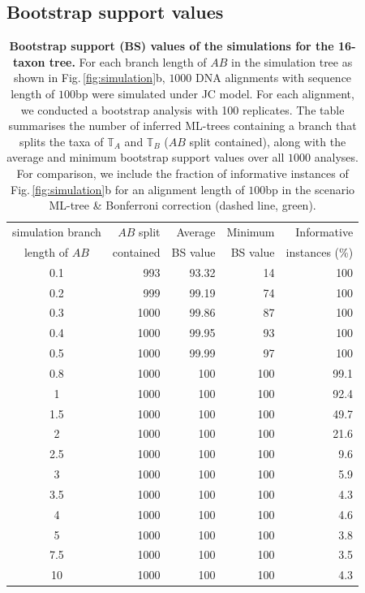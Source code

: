 \begin{appendices}
%

\bigskip

\subsection{Bootstrap support values}
\begin{table}[hb]
    \centering
    \begin{tabular}{|c|r|r|r|r|}
\hline
simulation branch & $AB$ split & Average  & Minimum & Informative\\
length of $AB$& contained   & BS value & BS value & instances (\%) \\
\hline
0.1 &  993 &  93.32 &  14 & 100   \\
0.2 &  999 &  99.19 &  74 & 100  \\
0.3 & 1000 &  99.86 &  87 & 100   \\
0.4 & 1000 &  99.95 &  93 & 100 \\
0.5 & 1000 &  99.99 &  97 & 100   \\
0.8 & 1000 & 100  & 100 &  99.1 \\
1   & 1000 & 100  & 100 &  92.4 \\
1.5 & 1000 & 100  & 100 &  49.7 \\
2   & 1000 & 100  & 100 &  21.6 \\
2.5 & 1000 & 100  & 100 &   9.6 \\
3   & 1000 & 100  & 100 &   5.9 \\
3.5 & 1000 & 100  & 100 &   4.3 \\
4   & 1000 & 100  & 100 &   4.6 \\
5   & 1000 & 100  & 100 &   3.8 \\
7.5 & 1000 & 100  & 100 &   3.5 \\
10  & 1000 & 100  & 100 &   4.3 \\
\hline
    \end{tabular}
    \vspace{0.25cm}
    \caption{
        \textbf{Bootstrap support (BS) values of the simulations for the 16-taxon tree.} For each branch length of $AB$ in the simulation tree as shown in Fig.\,\ref{fig:simulation}b, $1000$ DNA alignments with sequence length of $100$bp were simulated under JC model. For each alignment, we conducted a bootstrap analysis with 100 replicates. The table summarises the number of inferred ML-trees containing a branch that splits the taxa of $\mathbb{T}_A$ and $\mathbb{T}_B$ ($AB$ split contained), along with the average  and minimum bootstrap support values over all $1000$ analyses.  For comparison, we include the fraction of informative instances of Fig.\,\ref{fig:simulation}b for an alignment length of $100$bp in the scenario  ML-tree \& Bonferroni correction (dashed line, {\color{MLtreeBonferroni}green}). 
}
\end{table}
\end{appendices}
